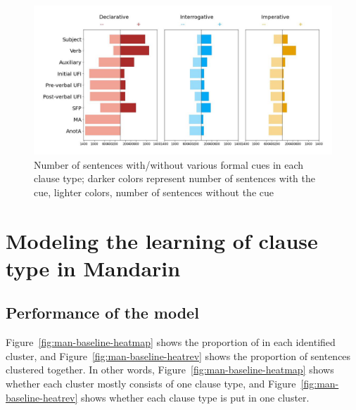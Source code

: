 \begin{figure}[H]
    \centering
    \includegraphics[width=1\textwidth]{figures/man-real-syncluster.jpg}
    \caption{Number of sentences with/without various formal cues in each clause type; darker colors represent number of sentences with the cue, lighter colors, number of sentences without the cue }
    \label{fig:man-real-syncluster}
\end{figure}




\section{Modeling the learning of clause type in 
Mandarin}
\label{sec:mancl:model}


\subsection{Performance of the \dlearnerabbr{} model}
\label{sec:mancl:model:results:d}

Figure~\ref{fig:man-baseline-heatmap} shows the proportion of \diis{} in each identified cluster, and Figure~\ref{fig:man-baseline-heatrev} shows the proportion of sentences clustered together. In other words, Figure~\ref{fig:man-baseline-heatmap} shows whether each cluster mostly consists of one clause type, and Figure~\ref{fig:man-baseline-heatrev} shows whether each clause type is put in one cluster.  



